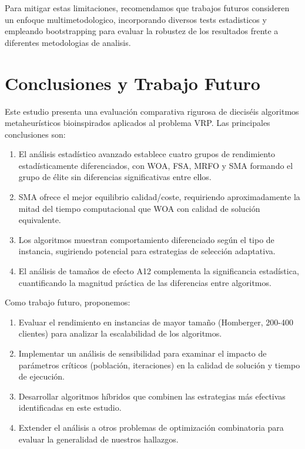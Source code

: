 \documentclass[conference,a4paper]{IEEEtran}
\begin{document}
Para mitigar estas limitaciones, recomendamos que trabajos futuros consideren un enfoque multimetodologico, incorporando diversos tests estadisticos y empleando bootstrapping para evaluar la robustez de los resultados frente a diferentes metodologias de analisis.

\section{Conclusiones y Trabajo Futuro}

Este estudio presenta una evaluación comparativa rigurosa de dieciséis algoritmos metaheurísticos bioinspirados aplicados al problema VRP. Las principales conclusiones son:

\begin{enumerate}
\item El análisis estadístico avanzado establece cuatro grupos de rendimiento estadísticamente diferenciados, con WOA, FSA, MRFO y SMA formando el grupo de élite sin diferencias significativas entre ellos.
\item SMA ofrece el mejor equilibrio calidad/coste, requiriendo aproximadamente la mitad del tiempo computacional que WOA con calidad de solución equivalente.
\item Los algoritmos muestran comportamiento diferenciado según el tipo de instancia, sugiriendo potencial para estrategias de selección adaptativa.
\item El análisis de tamaños de efecto A12 complementa la significancia estadística, cuantificando la magnitud práctica de las diferencias entre algoritmos.
\end{enumerate}

Como trabajo futuro, proponemos:

\begin{enumerate}
\item Evaluar el rendimiento en instancias de mayor tamaño (Homberger, 200-400 clientes) para analizar la escalabilidad de los algoritmos.
\item Implementar un análisis de sensibilidad para examinar el impacto de parámetros críticos (población, iteraciones) en la calidad de solución y tiempo de ejecución.
\item Desarrollar algoritmos híbridos que combinen las estrategias más efectivas identificadas en este estudio.
\item Extender el análisis a otros problemas de optimización combinatoria para evaluar la generalidad de nuestros hallazgos.
\end{enumerate}
\end{document}
